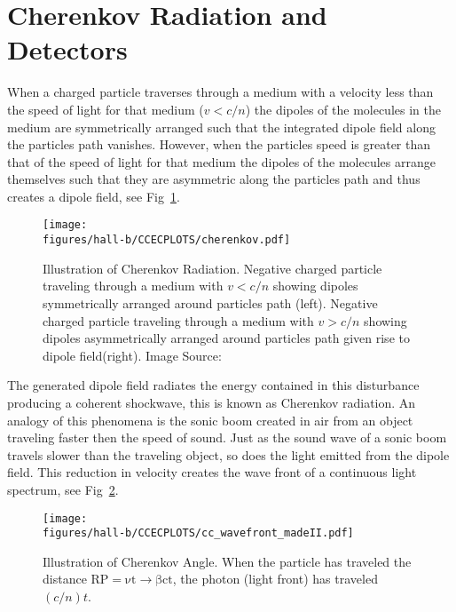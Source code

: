 \FloatBarrier
\section{Cherenkov Radiation and Detectors}\label{sec:clas.cc}

When a charged particle traverses through a medium with a velocity less than the speed of light for that medium ($v < c/n$) the dipoles of the molecules in the medium are symmetrically arranged such that the integrated dipole field along the particles path vanishes. However, when the particles speed is greater than that of the speed of light for that medium the dipoles of the molecules arrange themselves such that they are asymmetric along the particles path and thus creates a dipole field, see Fig~\ref{fig:clas.cc.dipole}.
\begin{figure}[h!]\begin{center}
\texttt{[image: \\figures/hall-b/CCECPLOTS/cherenkov.pdf]}
\caption[Illustration of Cherenkov Radiation]{\label{fig:clas.cc.dipole}Illustration of Cherenkov Radiation. Negative charged particle traveling through a medium with $v < c/n$ showing dipoles symmetrically arranged around particles path (left). Negative charged particle traveling through a medium with $v > c/n$ showing dipoles asymmetrically arranged around particles path given rise to dipole field(right). Image Source:~\cite{cherenkov_image}}
\end{center}\end{figure}

The generated dipole field radiates the energy contained in this disturbance producing a coherent shockwave, this is known as Cherenkov radiation. An analogy of this phenomena is the sonic boom created in air from an object traveling faster then the speed of sound. Just as the sound wave of a sonic boom travels slower than the traveling object, so does the light emitted from the dipole field. This reduction in velocity creates the wave front of a continuous light spectrum, see Fig~\ref{fig:clas.cc.angle}.
\begin{figure}[h!]\begin{center}
\texttt{[image: \\figures/hall-b/CCECPLOTS/cc\_wavefront\_madeII.pdf]}
\caption[Illustration of Cherenkov Angle]{\label{fig:clas.cc.angle}Illustration of Cherenkov Angle. When the particle has traveled the distance $\mathrm{RP =\nu t \rightarrow \beta c t}$, the photon (light front) has traveled $(c/n)t$.}
\end{center}\end{figure}

